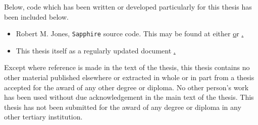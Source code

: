 Below, code which has been written or developed particularly for this thesis has been included below.

\begin{itemize}
    \item \cite{Sapphire} Robert M. Jones, \texttt{Sapphire} source code. This may be found at either \href{https://github.com/kcl-tscm/Sapphire} or \href{https://github.com/JonesRobM/Sapphire}.
    \item \cite{Thesis} This thesis itself as a regularly updated document \href{https://github.com/JonesRobM/PhD_Thesis}.
\end{itemize}


Except where reference is made in the text of the thesis, this thesis contains no other material published elsewhere or extracted in whole or in part from a thesis accepted for the award of any other degree or diploma. No other person's work has been used without due acknowledgement in the main text of the thesis. This thesis has not been submitted for the award of any degree or diploma in any other tertiary institution.

